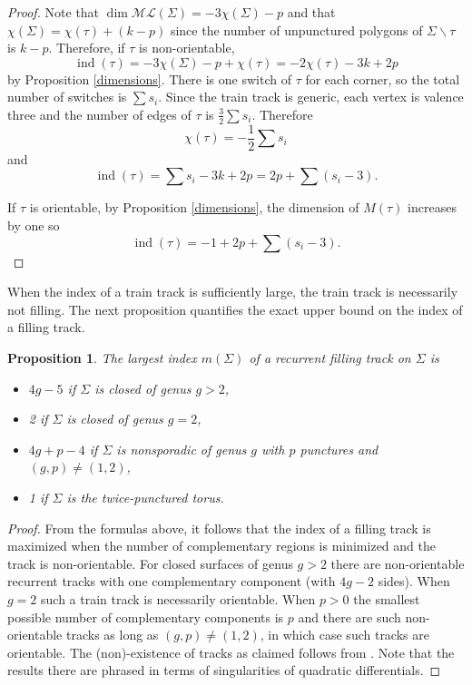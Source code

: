 \documentclass[11pt]{article}
\newtheorem{prop}[thm]{Proposition}
\theoremstyle{remark}
\def\ML{{\mathcal{ML}}}
\def\ind{\operatorname{ind}}
\begin{document}
\begin{proof}
Note that $\dim \ML(\Sigma) = -3\chi(\Sigma) - p$ and that
$\chi(\Sigma)=\chi(\tau)+(k-p)$ since the number of unpunctured
polygons of $\Sigma \smallsetminus \tau$ is $k-p$.
Therefore, if $\tau$ is non-orientable,
$$\ind(\tau) = -3\chi(\Sigma) - p + \chi(\tau) = -2\chi(\tau) -3k + 2p$$
by Proposition \ref{dimensions}.
There is one switch of $\tau$ for each corner, so the total number of switches is $\sum s_i$. Since the train track is generic, each vertex is valence three and the number of edges of $\tau$ is $\frac32\sum s_i$. Therefore
$$\chi(\tau) = -\frac12 \sum s_i$$
and
$$\ind(\tau) =  \sum s_i - 3k + 2p = 2p +\sum(s_i -3).$$

If $\tau$ is orientable, by Proposition \ref{dimensions}, the dimension of $M(\tau)$ increases by one so
$$\ind(\tau) =-1+ 2p + \sum(s_i -3).$$
\end{proof}


When the index of a train track is sufficiently large, the train track is necessarily
not filling. The next proposition quantifies the exact upper bound on the index of a filling
track.

\begin{prop}\label{ms}
  The largest index $m(\Sigma)$ of a recurrent filling track on $\Sigma$ is
  \begin{itemize}
  \item $4g-5$ if $\Sigma$ is closed of genus $g>2$,
  \item 2 if $\Sigma$ is closed of genus $g=2$,
    \item $4g+p-4$ if $\Sigma$ is nonsporadic of genus $g$ with $p$
      punctures and $(g,p)\neq (1,2)$,
      \item 1 if $\Sigma$ is the twice-punctured torus.
  \end{itemize}
\end{prop}

\begin{proof}
  From the formulas above, it follows that the index of a filling track
  is maximized when the
  number of complementary regions is minimized and the track is non-orientable. For
  closed surfaces of genus $g>2$ there are non-orientable recurrent
  tracks with one complementary component (with $4g-2$ sides).
  When $g=2$ such a train track is necessarily
  orientable. When $p>0$ the smallest possible number of complementary
  components is $p$ and there are such non-orientable tracks as long as
  $(g,p)\neq (1,2)$, in which case such tracks are orientable. The
  (non)-existence of tracks as claimed follows from
  \cite{masur-smillie}. Note that the results there are phrased in terms of
  singularities of quadratic differentials.
  \end{proof}
\end{document}

